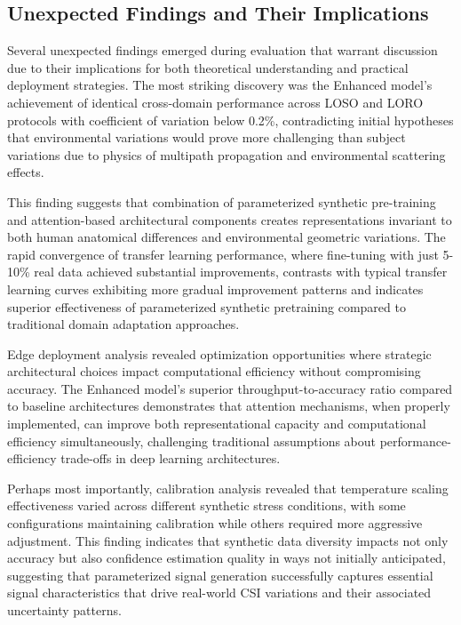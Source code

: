 \documentclass[journal]{IEEEtran}
\begin{document}
\subsection{Unexpected Findings and Their Implications}

Several unexpected findings emerged during evaluation that warrant discussion due to their implications for both theoretical understanding and practical deployment strategies. The most striking discovery was the Enhanced model's achievement of identical cross-domain performance across LOSO and LORO protocols with coefficient of variation below 0.2\%, contradicting initial hypotheses that environmental variations would prove more challenging than subject variations due to physics of multipath propagation and environmental scattering effects.

This finding suggests that combination of parameterized synthetic pre-training and attention-based architectural components creates representations invariant to both human anatomical differences and environmental geometric variations. The rapid convergence of transfer learning performance, where fine-tuning with just 5-10\% real data achieved substantial improvements, contrasts with typical transfer learning curves exhibiting more gradual improvement patterns and indicates superior effectiveness of parameterized synthetic pretraining compared to traditional domain adaptation approaches.

Edge deployment analysis revealed optimization opportunities where strategic architectural choices impact computational efficiency without compromising accuracy. The Enhanced model's superior throughput-to-accuracy ratio compared to baseline architectures demonstrates that attention mechanisms, when properly implemented, can improve both representational capacity and computational efficiency simultaneously, challenging traditional assumptions about performance-efficiency trade-offs in deep learning architectures.

Perhaps most importantly, calibration analysis revealed that temperature scaling effectiveness varied across different synthetic stress conditions, with some configurations maintaining calibration while others required more aggressive adjustment. This finding indicates that synthetic data diversity impacts not only accuracy but also confidence estimation quality in ways not initially anticipated, suggesting that parameterized signal generation successfully captures essential signal characteristics that drive real-world CSI variations and their associated uncertainty patterns.
\end{document}
